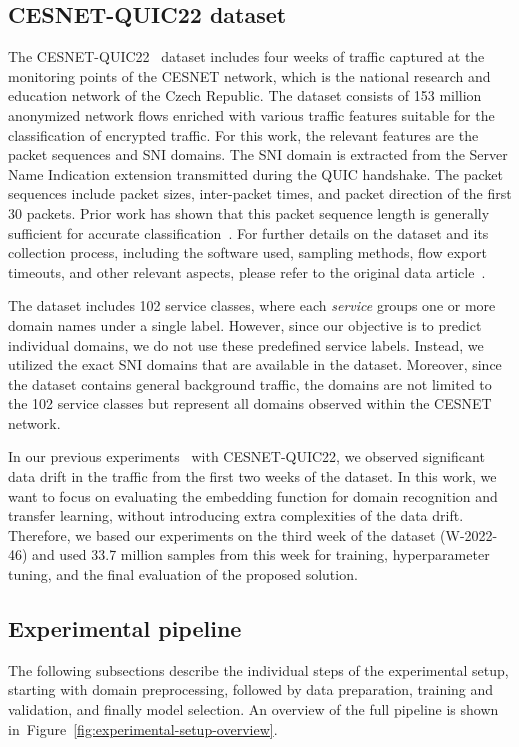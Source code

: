 \documentclass[lettersize,journal,twoside,article]{IEEEtran}
\newcommand{\figref}[1]{Figure~\ref{#1}}
\begin{document}
\subsection{CESNET-QUIC22 dataset}
\label{sec:dataset}
The CESNET-QUIC22~\cite{Luxemburk2023QUICDataset} dataset includes four weeks of traffic captured at the monitoring points of the CESNET network, which is the national research and education network of the Czech Republic. The dataset consists of 153 million anonymized network flows enriched with various traffic features suitable for the classification of encrypted traffic. For this work, the relevant features are the packet sequences and SNI domains. The SNI domain is extracted from the Server Name Indication extension transmitted during the QUIC handshake. The packet sequences include packet sizes, inter-packet times, and packet direction of the first 30 packets. Prior work has shown that this packet sequence length is generally sufficient for accurate classification~\cite{Luxemburk2023QUIC, Luxemburk2023TLS}. For further details on the dataset and its collection process, including the software used, sampling methods, flow export timeouts, and other relevant aspects, please refer to the original data article~\cite{Luxemburk2023QUICDataset}.

The dataset includes 102 service classes, where each \textit{service} groups one or more domain names under a single label. However, since our objective is to predict individual domains, we do not use these predefined service labels. Instead, we utilized the exact SNI domains that are available in the dataset. Moreover, since the dataset contains general background traffic, the domains are not limited to the 102 service classes but represent all domains observed within the CESNET network.

In our previous experiments~\cite{Luxemburk2023QUIC} with CESNET-QUIC22, we observed significant data drift in the traffic from the first two weeks of the dataset. In this work, we want to focus on evaluating the embedding function for domain recognition and transfer learning, without introducing extra complexities of the data drift. Therefore, we based our experiments on the third week of the dataset {(W-2022-46)} and used 33.7 million samples from this week for training, hyperparameter tuning, and the final evaluation of the proposed solution.

\subsection{Experimental pipeline}
The following subsections describe the individual steps of the experimental setup, starting with domain preprocessing, followed by data preparation, training and validation, and finally model selection. An overview of the full pipeline is shown in~\figref{fig:experimental-setup-overview}.
\end{document}

